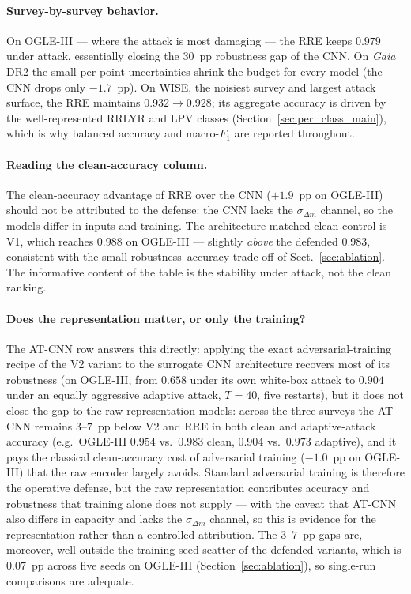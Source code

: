 \documentclass{aa}
\begin{document}
\paragraph{Survey-by-survey behavior.}
On OGLE-III --- where the attack is most damaging --- the RRE keeps $0.979$ under attack, essentially closing the $30$~pp robustness gap of the CNN. On \textit{Gaia} DR2 the small per-point uncertainties shrink the budget for every model (the CNN drops only $-1.7$~pp). On WISE, the noisiest survey and largest attack surface, the RRE maintains $0.932 \to 0.928$; its aggregate accuracy is driven by the well-represented RRLYR and LPV classes (Section~\ref{sec:per_class_main}), which is why balanced accuracy and macro-$F_1$ are reported throughout.

\paragraph{Reading the clean-accuracy column.}
The clean-accuracy advantage of RRE over the CNN ($+1.9$~pp on OGLE-III) should not be attributed to the defense: the CNN lacks the $\sigma_{\Delta m}$ channel, so the models differ in inputs and training. The architecture-matched clean control is V1, which reaches $0.988$ on OGLE-III --- slightly \emph{above} the defended $0.983$, consistent with the small robustness--accuracy trade-off of Sect.~\ref{sec:ablation}. The informative content of the table is the stability under attack, not the clean ranking.

\paragraph{Does the representation matter, or only the training?}
The AT-CNN row answers this directly: applying the exact adversarial-training
recipe of the V2 variant to the surrogate CNN architecture recovers most
of its robustness (on OGLE-III, from $0.658$ under its own white-box
attack to $0.904$ under an equally aggressive adaptive attack, $T=40$,
five restarts), but it does not close the gap to the raw-representation
models: across the three surveys the AT-CNN remains $3$--$7$~pp below V2
and RRE in both clean and adaptive-attack accuracy (e.g.\ OGLE-III
$0.954$ vs.\ $0.983$ clean, $0.904$ vs.\ $0.973$ adaptive), and it pays
the classical clean-accuracy cost of adversarial training ($-1.0$~pp on
OGLE-III) that the raw encoder largely avoids.
Standard adversarial training is therefore the operative defense, but the raw representation contributes accuracy and robustness that training alone does not supply --- with the caveat that AT-CNN also differs in capacity and lacks the $\sigma_{\Delta m}$ channel, so this is evidence for the representation rather than a controlled attribution. The $3$--$7$~pp gaps are, moreover, well outside the training-seed scatter of the defended variants, which is $0.07$~pp across five seeds on OGLE-III (Section~\ref{sec:ablation}), so single-run comparisons are adequate.
\end{document}
